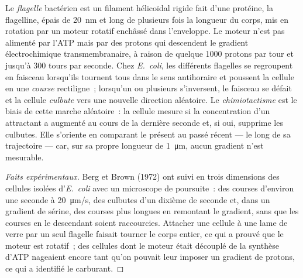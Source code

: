 \begin{proposition}\label{prop:b2:unicellular-diversity:flagellum}
Le \emph{flagelle} bactérien est un filament hélicoïdal rigide fait
d'une protéine, la flagelline, épais de \qty{20}{nm} et long de
plusieurs fois la longueur du corps, mis en rotation par un moteur
rotatif enchâssé dans l'enveloppe. Le moteur n'est pas alimenté par
l'ATP mais par des protons qui descendent le gradient électrochimique
transmembranaire, à raison de quelque \num{1000} protons par tour et
jusqu'à \num{300} tours par seconde. Chez \emph{E.~coli}, les différents
flagelles se regroupent en faisceau lorsqu'ils tournent tous dans le
sens antihoraire et poussent la cellule en une \emph{course} rectiligne~;
lorsqu'un ou plusieurs s'inversent, le faisceau se défait et la cellule
\emph{culbute} vers une nouvelle direction aléatoire. Le
\emph{chimiotactisme} est le biais de cette marche aléatoire~: la
cellule mesure si la concentration d'un attractant a augmenté au cours
de la dernière seconde et, si oui, supprime les culbutes. Elle s'oriente
en comparant le présent au passé récent --- le long de sa trajectoire
--- car, sur sa propre longueur de \qty{1}{\micro m}, aucun gradient
n'est mesurable.
\end{proposition}
\begin{proof}[Faits expérimentaux]
Berg et Brown (1972) ont suivi en trois dimensions des cellules isolées
d'\emph{E.~coli} avec un microscope de poursuite~: des courses d'environ
une seconde à \qty{20}{\micro m/s}, des culbutes d'un dixième de seconde
et, dans un gradient de sérine, des courses plus longues en remontant le
gradient, sans que les courses en le descendant soient raccourcies.
Attacher une cellule à une lame de verre par un seul flagelle faisait
tourner le corps entier, ce qui a prouvé que le moteur est rotatif~; des
cellules dont le moteur était découplé de la synthèse d'ATP nageaient
encore tant qu'on pouvait leur imposer un gradient de protons, ce qui a
identifié le carburant.
\end{proof}


